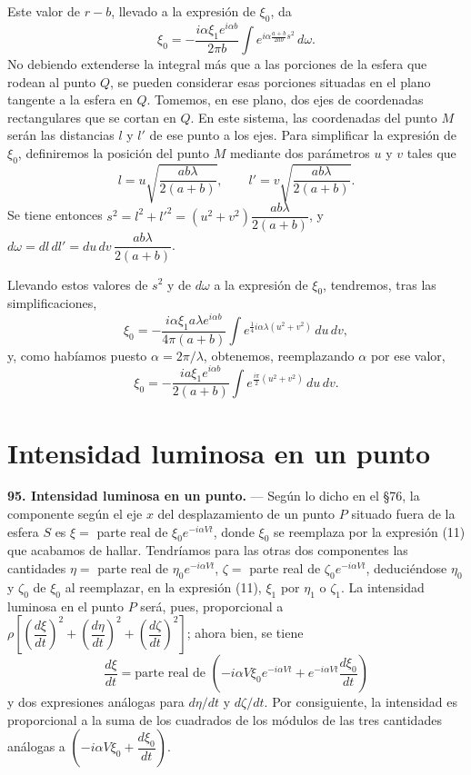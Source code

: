 Este valor de $r-b$, llevado a la expresión de $\xi_0$, da
\[
\xi_0 = -\frac{i\alpha\xi_1e^{i\alpha b}}{2\pi b}
\int e^{i\alpha\frac{a+b}{2ab}s^2}\,d\omega.
\]
No debiendo extenderse la integral más que a las porciones de la esfera
que rodean al punto $Q$, se pueden considerar esas porciones situadas en
el plano tangente a la esfera en $Q$. Tomemos, en ese plano, dos ejes de
coordenadas rectangulares que se cortan en $Q$. En este sistema, las
coordenadas del punto $M$ serán las distancias $l$ y $l'$ de ese punto a
los ejes. Para simplificar la expresión de $\xi_0$, definiremos la
posición del punto $M$ mediante dos parámetros $u$ y $v$ tales que
\[
l=u\sqrt{\frac{ab\lambda}{2(a+b)}},\qquad
l'=v\sqrt{\frac{ab\lambda}{2(a+b)}}.
\]
Se tiene entonces $s^2=l^2+l'^2=(u^2+v^2)\dfrac{ab\lambda}{2(a+b)}$, y
$d\omega=dl\,dl'=du\,dv\,\dfrac{ab\lambda}{2(a+b)}$.

Llevando estos valores de $s^2$ y de $d\omega$ a la expresión de $\xi_0$,
tendremos, tras las simplificaciones,
\[
\xi_0 = -\frac{i\alpha\xi_1a\lambda e^{i\alpha b}}{4\pi(a+b)}
\int e^{\frac14 i\alpha\lambda(u^2+v^2)}\,du\,dv,
\]
y, como habíamos puesto $\alpha=2\pi/\lambda$, obtenemos, reemplazando
$\alpha$ por ese valor,
\begin{equation}
\xi_0 = -\frac{ia\xi_1e^{i\alpha b}}{2(a+b)}
\int e^{\frac{i\pi}{2}(u^2+v^2)}\,du\,dv.
\tag{11}
\end{equation}

\section{Intensidad luminosa en un punto}

\noindent\textbf{95. Intensidad luminosa en un punto.} — Según lo dicho en
el §76, la componente según el eje $x$ del desplazamiento de un punto $P$
situado fuera de la esfera $S$ es $\xi=$ parte real de $\xi_0e^{-i\alpha Vt}$,
donde $\xi_0$ se reemplaza por la expresión (11) que acabamos de hallar.
Tendríamos para las otras dos componentes las cantidades
$\eta=$ parte real de $\eta_0e^{-i\alpha Vt}$,
$\zeta=$ parte real de $\zeta_0e^{-i\alpha Vt}$, deduciéndose $\eta_0$ y
$\zeta_0$ de $\xi_0$ al reemplazar, en la expresión (11), $\xi_1$ por
$\eta_1$ o $\zeta_1$. La intensidad luminosa en el punto $P$ será, pues,
proporcional a
$\rho\!\left[\!\left(\dfrac{d\xi}{dt}\right)^2+\!
\left(\dfrac{d\eta}{dt}\right)^2+\!\left(\dfrac{d\zeta}{dt}\right)^2\right]$;
ahora bien, se tiene
\[
\frac{d\xi}{dt} = \text{parte real de }
\left(-i\alpha V\xi_0e^{-i\alpha Vt}+e^{-i\alpha Vt}\frac{d\xi_0}{dt}\right)
\]
y dos expresiones análogas para $d\eta/dt$ y $d\zeta/dt$. Por
consiguiente, la intensidad es proporcional a la suma de los cuadrados de
los módulos de las tres cantidades análogas a
$\left(-i\alpha V\xi_0+\dfrac{d\xi_0}{dt}\right)$.

